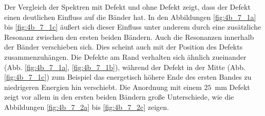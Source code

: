 Der Vergleich der Spektren mit Defekt und ohne Defekt zeigt, dass der Defekt einen deutlichen Einfluss auf die Bänder hat.
In den Abbildungen \ref{fig:4b_7_1a} bis \ref{fig:4b_7_1c} äußert sich dieser Einfluss unter anderem durch eine zusätzliche Resonanz zwischen den ersten beiden Bändern. 
Auch die Resonanzen innerhalb der Bänder verschieben sich.
Dies scheint auch mit der Position des Defekts zusammenzuhängen. Die Defekte am Rand verhalten sich ähnlich zueinander (Abb. \ref{fig:4b_7_1a}, \ref{fig:4b_7_1b}), während der Defekt in der Mitte (Abb. \ref{fig:4b_7_1c}) zum Beispiel das energetisch höhere Ende des ersten Bandes zu niedrigeren Energien hin verschiebt.
Die Anordnung mit einem $25$~mm Defekt zeigt vor allem in den ersten beiden Bändern große Unterschiede, wie die Abbildungen \ref{fig:4b_7_2a} bis \ref{fig:4b_7_2c} zeigen.